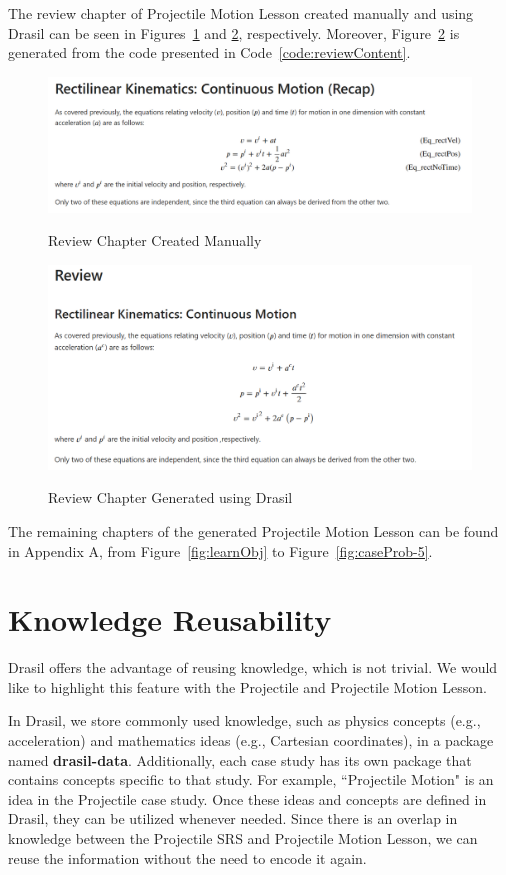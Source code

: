 The review chapter of Projectile Motion Lesson created manually and using 
Drasil can be seen in Figures~\ref{fig:review_manual} and 
\ref{fig:review_drasil}, respectively. Moreover, Figure~\ref{fig:review_drasil} 
is generated from the code presented in Code~\ref{code:reviewContent}.

\begin{figure}[h!]
	\caption{Review Chapter Created Manually}
	\includegraphics[width=1\textwidth]{figures/review_manual.png}
	\label{fig:review_manual}
\end{figure}

\begin{figure}[h!]
	\caption{Review Chapter Generated using Drasil}
	\includegraphics[width=1\textwidth]{figures/review_drasil.png}
	\label{fig:review_drasil}
\end{figure}

The remaining chapters of the generated Projectile Motion Lesson can be found 
in Appendix A, from Figure~\ref{fig:learnObj} to Figure~\ref{fig:caseProb-5}. 

\section{Knowledge Reusability}
Drasil offers the advantage of reusing knowledge, which is not trivial. We 
would like to highlight this feature with the Projectile and Projectile Motion 
Lesson. 

In Drasil, we store commonly used knowledge, such as physics concepts (e.g., 
acceleration) and mathematics ideas (e.g., Cartesian coordinates), in a package 
named \textbf{drasil-data}. Additionally, each case study has its own package 
that contains concepts specific to that study. For example, ``Projectile 
Motion" is an idea in the Projectile case study. Once these ideas and concepts 
are defined in Drasil, they can be utilized whenever needed. Since there is an 
overlap in knowledge between the Projectile SRS and Projectile Motion Lesson, 
we can reuse the information without the need to encode it again.

